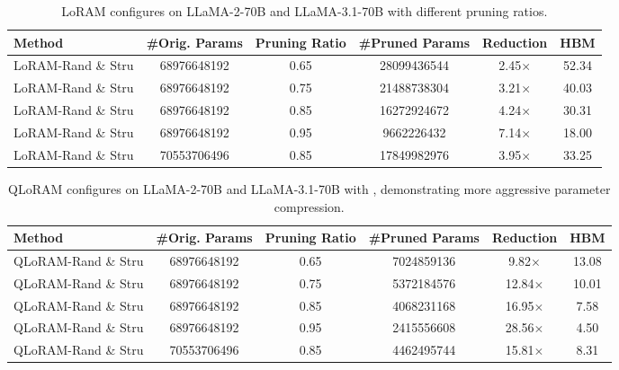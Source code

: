 \begin{table*}[h]
    \centering
    \renewcommand{\arraystretch}{1.1}
    \setlength{\tabcolsep}{3pt}

    \caption{LoRAM configures on LLaMA-2-70B and LLaMA-3.1-70B with different pruning ratios.}
    \label{tab:llama2_70b}
    \begin{tabular}{@{}lccccc@{}}
        \toprule
        Method & \#Orig. Params & Pruning Ratio & \#Pruned Params & Reduction & HBM \\ 
        \midrule
        LoRAM-Rand \& Stru & 68976648192 & 0.65 & 28099436544 & 2.45$\times$ & 52.34 \\
        LoRAM-Rand \& Stru & 68976648192 & 0.75 & 21488738304 & 3.21$\times$ & 40.03 \\
        LoRAM-Rand \& Stru & 68976648192 & 0.85 & 16272924672 & 4.24$\times$ & 30.31 \\
        LoRAM-Rand \& Stru & 68976648192 & 0.95 & 9662226432 & 7.14$\times$ & 18.00 \\
        LoRAM-Rand \& Stru & 70553706496 & 0.85 & 17849982976 & 3.95$\times$ & 33.25 \\
        \bottomrule
    \end{tabular}
\end{table*}

\begin{table*}[h]
    \centering
    \renewcommand{\arraystretch}{1.1}
    \setlength{\tabcolsep}{3pt}

    \caption{QLoRAM configures on LLaMA-2-70B and LLaMA-3.1-70B with , demonstrating more aggressive parameter compression.}
    \label{tab:llama2_70b_q}
    \begin{tabular}{@{}lccccc@{}}
        \toprule
        Method & \#Orig. Params & Pruning Ratio & \#Pruned Params & Reduction & HBM \\ 
        \midrule
        QLoRAM-Rand \& Stru & 68976648192 & 0.65 & 7024859136 & 9.82$\times$ & 13.08 \\
        QLoRAM-Rand \& Stru & 68976648192 & 0.75 & 5372184576 & 12.84$\times$ & 10.01 \\
        QLoRAM-Rand \& Stru & 68976648192 & 0.85 & 4068231168 & 16.95$\times$ & 7.58 \\
        QLoRAM-Rand \& Stru & 68976648192 & 0.95 & 2415556608 & 28.56$\times$ & 4.50 \\
        QLoRAM-Rand \& Stru & 70553706496 & 0.85 &  4462495744 & 15.81$\times$ & 8.31 \\
        \bottomrule
    \end{tabular}
\end{table*}










